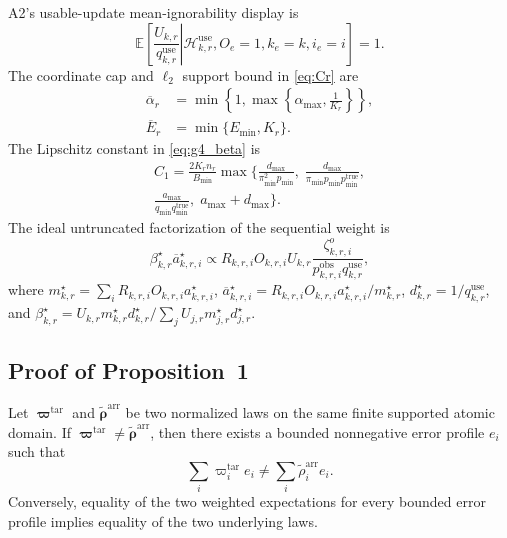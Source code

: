 A2's usable-update mean-ignorability display is
\begin{equation}
 \mathbb{E}\!\left[
 \left.
 \frac{U_{k,r}}{q^{\mathrm{use}}_{k,r}}
 \right|
 \mathcal{H}^{\mathrm{use}}_{k,r},
 O_e=1,k_e=k,i_e=i
 \right]
 =1.
 \label{eq:A2_use_mean_ignorability}
\end{equation}
The coordinate cap and $\ell_2$ support bound in \eqref{eq:Cr} are
\begin{equation}
\begin{aligned}
 \overline\alpha_r
 &=
 \min\!\left\{
 1,
 \max\!\left\{
 \alpha_{\max},
 \frac{1}{K_r}
 \right\}
 \right\},\\
 \overline E_r
 &=
 \min\{E_{\min},K_r\}.
\end{aligned}
 \label{eq:cap_ess}
\end{equation}
The Lipschitz constant in \eqref{eq:g4_beta} is
\begin{multline}
C_1
=
\frac{2K_r n_r}{B_{\min}}
\max\Biggl\{
\frac{d_{\max}}{\pi_{\min}^2 p_{\min}},\;
\frac{d_{\max}}{\pi_{\min}p_{\min}p_{\min}^{\mathrm{true}}},\\
\frac{a_{\max}}{q_{\min}q_{\min}^{\mathrm{true}}},\;
a_{\max}+d_{\max}
\Biggr\}.
\label{eq:g4_c1}
\end{multline}
The ideal untruncated factorization of the sequential weight is
\begin{equation}
 \beta^\star_{k,r}\overline a^\star_{k,r,i}
 \propto
 R_{k,r,i}O_{k,r,i}U_{k,r}
 \frac{\zeta^{o}_{k,r,i}}
 {p^{\mathrm{obs}}_{k,r,i}q^{\mathrm{use}}_{k,r}},
 \label{eq:factorized_global_weight}
\end{equation}
where
$m^\star_{k,r}=\sum_i R_{k,r,i}O_{k,r,i}a^\star_{k,r,i}$,
$\overline a^\star_{k,r,i}=R_{k,r,i}O_{k,r,i}a^\star_{k,r,i}/m^\star_{k,r}$,
$d^\star_{k,r}=1/q^{\mathrm{use}}_{k,r}$, and
$\beta^\star_{k,r}=U_{k,r}m^\star_{k,r}d^\star_{k,r}/
\sum_j U_{j,r}m^\star_{j,r}d^\star_{j,r}$.

\subsection{Proof of Proposition~1}
\label{app:proof_prop1}

\begin{proposition*}
Let $\boldsymbol\varpi^{\mathrm{tar}}$ and
$\widetilde{\boldsymbol\rho}^{\mathrm{arr}}$ be two normalized laws on the same
finite supported atomic domain.  If
$\boldsymbol\varpi^{\mathrm{tar}}\neq
\widetilde{\boldsymbol\rho}^{\mathrm{arr}}$, then there exists a bounded
nonnegative error profile $e_i$ such that
\begin{equation}
    \sum_i \varpi_i^{\mathrm{tar}}e_i
    \neq
    \sum_i \widetilde\rho_i^{\mathrm{arr}}e_i.
    \label{eq:app_prop1_claim}
\end{equation}
Conversely, equality of the two weighted expectations for every bounded error
profile implies equality of the two underlying laws.
\end{proposition*}

